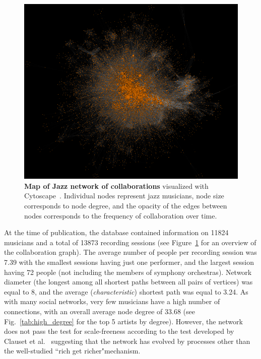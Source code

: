 \documentclass[12pt]{cmuthesis}
\begin{document}
  \begin{figure}[t]
    \centering
    \includegraphics[width=\linewidth]{figures/full_network_cropped.png}
    \caption{\textbf{Map of Jazz network of collaborations} visualized with Cytoscape~\cite{Cytoscape}. Individual nodes represent jazz musicians, node size corresponds to node degree, and the opacity of the edges between nodes corresponds to the frequency of collaboration over time.}
    \label{fig:moj:fullnetwork}
  \end{figure}



  At the time of publication, the database contained information on 11824 musicians and a total of 13873 recording sessions (see Figure~\ref{fig:moj:fullnetwork} for an overview of the collaboration graph). The average number of people per recording session was 7.39 with the smallest sessions having just one performer, and the largest session having 72 people (not including the members of symphony orchestras). Network diameter (the longest among all shortest paths between all pairs of vertices) was equal to 8, and the average (\emph{characteristic}) shortest path was equal to 3.24. As with many social networks, very few musicians have a high number of connections, with an overall average node degree of 33.68 (see Fig.~\ref{tab:high_degree} for the top 5 artists by degree). However, the network does not pass the test for scale-freeness according to the test developed by Clauset et al.~\cite{Clauset2009b} suggesting that the network has evolved by processes other than the well-studied ``rich get richer"mechanism.
\end{document}
